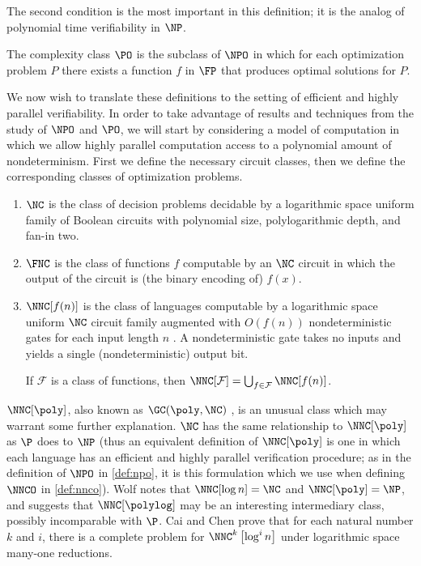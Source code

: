 The second condition is the most important in this definition; it is the analog of polynomial time verifiability in $\NP$.

\begin{definition}
  The complexity class $\PO$ is the subclass of $\NPO$ in which for each optimization problem $P$ there exists a function $f$ in $\FP$ that produces optimal solutions for $P$.
\end{definition}

We now wish to translate these definitions to the setting of efficient and highly parallel verifiability.
In order to take advantage of results and techniques from the study of $\NPO$ and $\PO$, we will start by considering a model of computation in which we allow highly parallel computation access to a polynomial amount of nondeterminism.
First we define the necessary circuit classes, then we define the corresponding classes of optimization problems.

\begin{definition}
  \mbox{}
  \begin{enumerate}
  \item $\NC$ is the class of decision problems decidable by a logarithmic space uniform family of Boolean circuits with polynomial size, polylogarithmic depth, and fan-in two.
  \item $\FNC$ is the class of functions $f$ computable by an $\NC$ circuit in which the output of the circuit is (the binary encoding of) $f(x)$.
  \item $\NNC[f(n)]$ is the class of languages computable by a logarithmic space uniform $\NC$ circuit family augmented with $O(f(n))$ nondeterministic gates for each input length $n$ \cite{wolf94}.
    A nondeterministic gate takes no inputs and yields a single (nondeterministic) output bit.

    If $\mathcal{F}$ is a class of functions, then $\NNC[\mathcal{F}] = \bigcup_{f \in \mathcal{F}} \NNC[f(n)]$.
  \end{enumerate}
\end{definition}

$\NNC[\poly]$, also known as $\GC(\poly, \NC)$ \cite{cc97} %
, is an unusual class which may warrant some further explanation.
$\NC$ has the same relationship to $\NNC[\poly]$ as $\P$ does to $\NP$ (thus an equivalent definition of $\NNC[\poly]$ is one in which each language has an efficient and highly parallel verification procedure; as in the definition of $\NPO$ in \autoref{def:npo}, it is this formulation which we use when defining $\NNCO$ in \autoref{def:nnco}).
Wolf \cite{wolf94} notes that $\NNC[\log n]=\NC$ and $\NNC[\poly]=\NP$, and suggests that $\NNC[\polylog]$ may be an interesting intermediary class, possibly incomparable with $\P$.
Cai and Chen \cite{cc97} prove that for each natural number $k$ and $i$, there is a complete problem for $\NNC^k\left[\log^i n\right]$ under logarithmic space many-one reductions.

